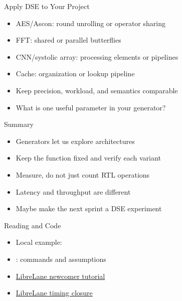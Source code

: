 \begin{frame}{Apply DSE to Your Project}
\begin{itemize}
\item AES/Ascon: round unrolling or operator sharing
\item FFT: shared or parallel butterflies
\item CNN/systolic array: processing elements or pipelines
\item Cache: organization or lookup pipeline
\item Keep precision, workload, and semantics comparable
\item What is one useful parameter in your generator?
\end{itemize}
\end{frame}

\begin{frame}{Summary}
\begin{itemize}
\item Generators let us explore architectures
\item Keep the function fixed and verify each variant
\item Measure, do not just count RTL operations
\item Latency and throughput are different
\item Maybe make the next sprint a DSE experiment
\end{itemize}
\end{frame}

\begin{frame}{Reading and Code}
\begin{itemize}
\item Local example: 
\item {}: commands and assumptions
\item \href{https://librelane.readthedocs.io/en/latest/getting_started/newcomers/index.html}{LibreLane newcomer tutorial}
\item \href{https://librelane.readthedocs.io/en/latest/usage/timing_closure/index.html}{LibreLane timing closure}
\end{itemize}
\end{frame}


